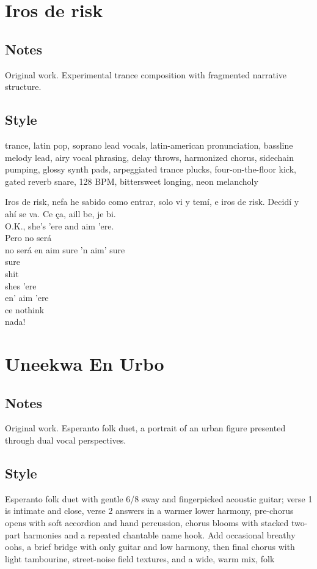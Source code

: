 \section{Iros de risk}

\subsection{Notes}
Original work.
Experimental trance composition with fragmented narrative structure.

\subsection{Style}
trance, latin pop, soprano lead vocals, latin-american pronunciation, bassline melody lead, airy vocal phrasing, delay throws, harmonized chorus, sidechain pumping, glossy synth pads, arpeggiated trance plucks, four-on-the-floor kick, gated reverb snare, 128 BPM, bittersweet longing, neon melancholy

\begin{lyrics}
Iros de risk, nefa he sabido como entrar, solo vi y temí, e iros de risk.  Decidí y ahí se va.  Ce ça, aill be, je bi.\\
O.K., she's 'ere and aim 'ere.\\
Pero no será\\
no será en aim sure
'n aim' sure\\
sure\\
shit\\
shes 'ere\\
en' aim 'ere\\
ce nothink\\
nada!
\end{lyrics}

\section{Uneekwa En Urbo}

\subsection{Notes}
Original work.
Esperanto folk duet, a portrait of an urban figure presented through dual vocal perspectives.

\subsection{Style}
Esperanto folk duet with gentle 6/8 sway and fingerpicked acoustic guitar; verse 1 is intimate and close, verse 2 answers in a warmer lower harmony, pre-chorus opens with soft accordion and hand percussion, chorus blooms with stacked two-part harmonies and a repeated chantable name hook. Add occasional breathy oohs, a brief bridge with only guitar and low harmony, then final chorus with light tambourine, street-noise field textures, and a wide, warm mix, folk

